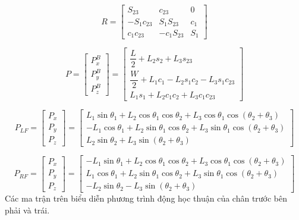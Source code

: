 \begin{equation}
R=
\begin{bmatrix}
S_{23} & c_{23} & 0 \\
- S_1 c_{23} & S_1 S_{23} & c_1 \\
c_1 c_{23} & - c_1 S_{23} & S_1
\end{bmatrix}
\end{equation}

\begin{equation}
P =
\begin{bmatrix}
P_x^B \\
P_y^B \\
P_z^B
\end{bmatrix}
=
\begin{bmatrix}
\dfrac{L}{2}+L_2 s_2 + L_3 s_{23} \\
\dfrac{W}{2}+L_1 c_1 - L_2 s_1 c_2 - L_3 s_1 c_{23} \\
L_1 s_1 + L_2 c_1 c_2 + L_3 c_1 c_{23}
\end{bmatrix}
\end{equation}

\begin{equation}
P_{LF}=
\begin{bmatrix}
P_x \\
P_y \\
P_z
\end{bmatrix}
=
\begin{bmatrix}
L_1\sin\theta_1 + L_2\cos\theta_1\cos\theta_2 + L_3\cos\theta_1\cos(\theta_2+\theta_3) \\
- L_1\cos\theta_1 + L_2\sin\theta_1\cos\theta_2 + L_3\sin\theta_1\cos(\theta_2+\theta_3) \\
L_2\sin\theta_2 + L_3\sin(\theta_2+\theta_3)
\end{bmatrix}
\label{eq:1}
\end{equation}

\begin{equation}
P_{RF}=
\begin{bmatrix}
P_x \\
P_y \\
P_z
\end{bmatrix}
=
\begin{bmatrix}
- L_1\sin\theta_1 + L_2\cos\theta_1\cos\theta_2 + L_3\cos\theta_1\cos(\theta_2+\theta_3) \\
L_1\cos\theta_1 + L_2\sin\theta_1\cos\theta_2 + L_3\sin\theta_1\cos(\theta_2+\theta_3) \\
- L_2\sin\theta_2 - L_3\sin(\theta_2+\theta_3)
\end{bmatrix}
\label{eq:2}
\end{equation}
Các ma trận trên biểu diễn phương trình động học thuận của chân trước bên phải và trái.

